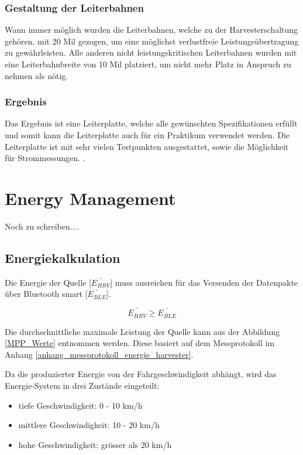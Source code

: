 \subsubsection{Gestaltung der Leiterbahnen}

Wann immer möglich wurden die Leiterbahnen, welche zu der Harvesterschaltung gehören, mit 20 Mil gezogen, um eine möglichst verlustfreie Leistungsübertragung zu gewährleisten. Alle anderen nicht leistungskritischen Leiterbahnen wurden mit eine Leiterbahnbreite von 10 Mil platziert, um nicht mehr Platz in Anspruch zu nehmen als nötig.

\subsubsection{Ergebnis}

Das Ergebnis ist eine Leiterplatte, welche alle gewünschten Spezifikationen erfüllt und somit kann die Leiterplatte auch für ein Praktikum verwendet werden. Die Leiterplatte ist mit sehr vielen Testpunkten ausgestattet, sowie die Möglichkeit für Strommessungen.
.

\section{Energy Management}

Noch zu schreiben....

\subsection{Energiekalkulation}

Die Energie der Quelle [$\bar{E_{HRV}} $] muss ausreichen für das Versenden der Datenpakte über Bluetooth smart [$\bar{E_{BLE}}$].

\[\bar{E_{HRV}} \ge \bar{E_{BLE}}  \]


Die durchschnittliche maximale Leistung der Quelle kann aus der Abbildung \ref{MPP_Werte} entnommen werden. Diese basiert auf dem Messprotokoll im Anhang \ref{anhang_messprotokoll_energie_harvester}. 

Da die produzierter Energie von der Fahrgeschwindigkeit abhängt, wird das Energie-System in drei Zustände eingeteilt:

\begin{itemize}
    \item tiefe Geschwindigkeit: 0 - 10 km/h
    \item mittlere Geschwindigkeit: 10 - 20 km/h 
    \item hohe Geschwindigkeit: grösser als 20 km/h 
\end{itemize}


